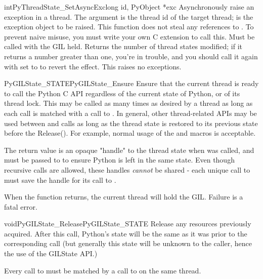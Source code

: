 \begin{cfuncdesc}{int}{PyThreadState_SetAsyncExc}{long id, PyObject *exc}
  Asynchronously raise an exception in a thread. 
  The  argument is the thread id of the target thread;
   is the exception object to be raised.
  This function does not steal any references to .
  To prevent naive misuse, you must write your own C extension 
  to call this.  Must be called with the GIL held. 
  Returns the number of thread states modified; if it returns a number 
  greater than one, you're in trouble, and you should call it again 
  with  set to  to revert the effect.
  This raises no exceptions.
\end{cfuncdesc}

\begin{cfuncdesc}{PyGILState_STATE}{PyGILState_Ensure}{}
Ensure that the current thread is ready to call the Python C API
regardless of the current state of Python, or of its thread lock.
This may be called as many times as desired by a thread as long as
each call is matched with a call to .
In general, other thread-related APIs may be used between
 and 
calls as long as the thread state is restored to its previous state
before the Release().  For example, normal usage of the
 and
 macros is acceptable.
    
The return value is an opaque "handle" to the thread state when
 was called, and must be passed to
 to ensure Python is left in the same
state. Even though recursive calls are allowed, these handles
\emph{cannot} be shared - each unique call to
 must save the handle for its call to
.
    
When the function returns, the current thread will hold the GIL.
Failure is a fatal error.
\end{cfuncdesc}

\begin{cfuncdesc}{void}{PyGILState_Release}{PyGILState_STATE}
Release any resources previously acquired.  After this call, Python's
state will be the same as it was prior to the corresponding
 call (but generally this state will be
unknown to the caller, hence the use of the GILState API.)
    
Every call to  must be matched by a call to 
 on the same thread.
\end{cfuncdesc}


